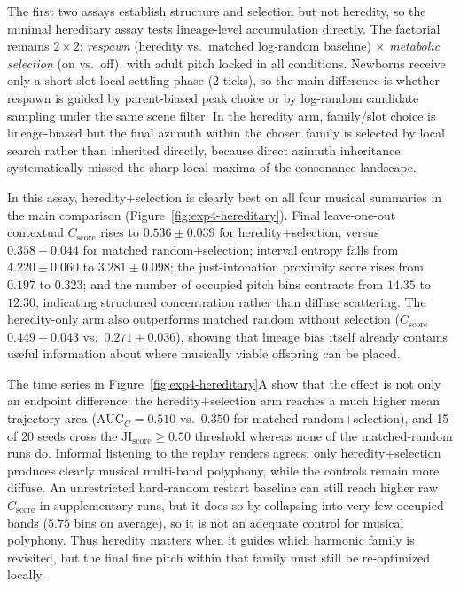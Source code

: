 \documentclass[letterpaper]{article}
\begin{document}
The first two assays establish structure and selection but not heredity, so the minimal hereditary assay tests lineage-level accumulation directly. The factorial remains $2\times 2$: \emph{respawn} (heredity vs.\ matched log-random baseline) $\times$ \emph{metabolic selection} (on vs.\ off), with adult pitch locked in all conditions. Newborns receive only a short slot-local settling phase (2 ticks), so the main difference is whether respawn is guided by parent-biased peak choice or by log-random candidate sampling under the same scene filter. In the heredity arm, family/slot choice is lineage-biased but the final azimuth within the chosen family is selected by local search rather than inherited directly, because direct azimuth inheritance systematically missed the sharp local maxima of the consonance landscape.

In this assay, heredity$+$selection is clearly best on all four musical summaries in the main comparison (Figure~\ref{fig:exp4-hereditary}). Final leave-one-out contextual $C_{\text{score}}$ rises to $0.536 \pm 0.039$ for heredity$+$selection, versus $0.358 \pm 0.044$ for matched random$+$selection; interval entropy falls from $4.220 \pm 0.060$ to $3.281 \pm 0.098$; the just-intonation proximity score rises from $0.197$ to $0.323$; and the number of occupied pitch bins contracts from $14.35$ to $12.30$, indicating structured concentration rather than diffuse scattering. The heredity-only arm also outperforms matched random without selection ($C_{\text{score}}$ $0.449 \pm 0.043$ vs.\ $0.271 \pm 0.036$), showing that lineage bias itself already contains useful information about where musically viable offspring can be placed.

The time series in Figure~\ref{fig:exp4-hereditary}A show that the effect is not only an endpoint difference: the heredity$+$selection arm reaches a much higher mean trajectory area ($\mathrm{AUC}_C = 0.510$ vs.\ $0.350$ for matched random$+$selection), and 15 of 20 seeds cross the $\mathrm{JI}_{\text{score}} \ge 0.50$ threshold whereas none of the matched-random runs do. Informal listening to the replay renders agrees: only heredity$+$selection produces clearly musical multi-band polyphony, while the controls remain more diffuse. An unrestricted hard-random restart baseline can still reach higher raw $C_{\text{score}}$ in supplementary runs, but it does so by collapsing into very few occupied bands ($5.75$ bins on average), so it is not an adequate control for musical polyphony. Thus heredity matters when it guides which harmonic family is revisited, but the final fine pitch within that family must still be re-optimized locally.
\end{document}
